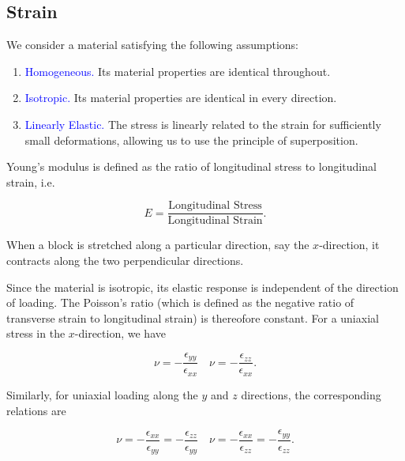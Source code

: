 \documentclass[10pt,a4paper]{article}
\begin{document}
\subsection{Strain}
\begin{assumption}
We consider a material satisfying the following assumptions:

\begin{enumerate}[label=\textsf{\textcolor{red!70!black}{A\arabic*.}}]

    \item \textsf{\textcolor{blue}{Homogeneous.}}
    Its material properties are identical throughout.

    \item \textsf{\textcolor{blue}{Isotropic.}}
    Its material properties are identical in every direction.

    \item \textsf{\textcolor{blue}{Linearly Elastic.}}
    The stress is linearly related to the strain for sufficiently
    small deformations, allowing us to use the principle of
    superposition.

\end{enumerate}
\end{assumption}

\textcolor{red!70!black}{\textsf{Young's modulus}} is defined as the ratio of longitudinal
stress to longitudinal strain, i.e.

\[
E=\frac{\text{Longitudinal Stress}}{\text{Longitudinal Strain}}.
\]

When a block is stretched along a particular direction, say the
\(x\)-direction, it contracts along the two perpendicular
directions. 

Since the material is isotropic, its elastic response
is independent of the direction of loading. The Poisson's ratio (which is defined as the negative ratio of transverse strain to longitudinal strain) is thereofore constant. For a uniaxial stress in the \(x\)-direction, we have

\[
\nu=-\frac{\epsilon_{yy}}{\epsilon_{xx}}
\quad
\nu=-\frac{\epsilon_{zz}}{\epsilon_{xx}}.
\]

Similarly, for uniaxial loading along the \(y\) and \(z\) directions,
the corresponding relations are

\[
\nu=-\frac{\epsilon_{xx}}{\epsilon_{yy}}
=-\frac{\epsilon_{zz}}{\epsilon_{yy}}
\quad
\nu=-\frac{\epsilon_{xx}}{\epsilon_{zz}}
=-\frac{\epsilon_{yy}}{\epsilon_{zz}}.
\]
\end{document}
